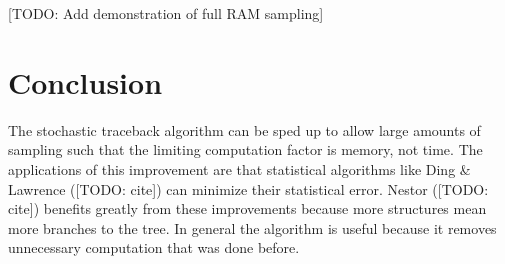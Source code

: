 [TODO: Add demonstration of full RAM sampling]

\section{Conclusion}

The stochastic traceback algorithm can be sped up to allow large
amounts of sampling such that the limiting computation factor is
memory, not time. The applications of this improvement are that
statistical algorithms like Ding \& Lawrence ([TODO: cite]) can
minimize their statistical error. Nestor ([TODO: cite]) benefits
greatly from these improvements because more structures mean more
branches to the tree. In general the algorithm is useful because it
removes unnecessary computation that was done before. 
